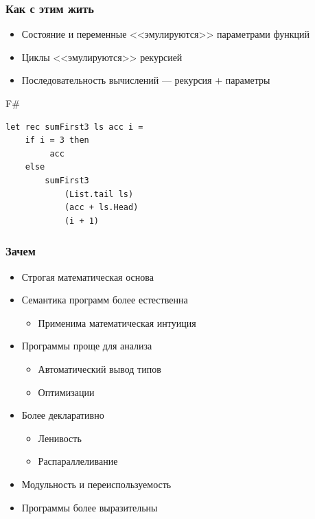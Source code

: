 \documentclass[xetex,mathserif,serif]{beamer}
\begin{document}
	\begin{frame}[fragile]
		\frametitle{Как с этим жить}
		\begin{itemize}
			\item Состояние и переменные <<эмулируются>> параметрами функций
			\item Циклы <<эмулируются>> рекурсией
			\item Последовательность вычислений --- рекурсия + параметры
		\end{itemize}
		\begin{exampleblock}{F\#}
			\begin{verbatim}
let rec sumFirst3 ls acc i =
    if i = 3 then 
         acc 
    else 
        sumFirst3 
            (List.tail ls) 
            (acc + ls.Head) 
            (i + 1)
            \end{verbatim}
		\end{exampleblock}
\end{frame}

	\begin{frame}
		\frametitle{Зачем}
		\begin{itemize}
			\item Строгая математическая основа
			\item Семантика программ более естественна
			\begin{itemize}
				\item Применима математическая интуиция
			\end{itemize}
			\item Программы проще для анализа
			\begin{itemize}
				\item Автоматический вывод типов
				\item Оптимизации
			\end{itemize}
			\item Более декларативно
			\begin{itemize}
				\item Ленивость
				\item Распараллеливание
			\end{itemize}
			\item Модульность и переиспользуемость
			\item Программы более выразительны
		\end{itemize}
	\end{frame}
	
\end{document}
